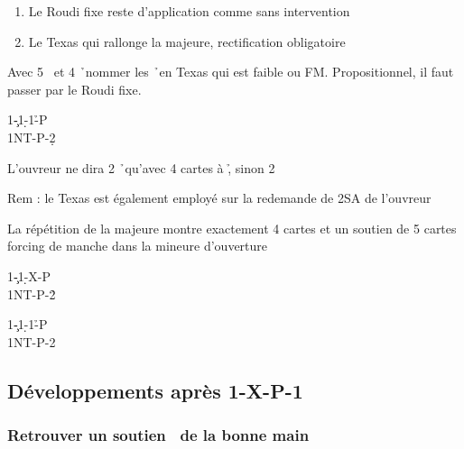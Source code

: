 \documentclass[a4paper]{article}
\begin{document}
\begin{enumerate}
\item Le Roudi fixe reste d’application comme sans intervention

\item Le Texas qui rallonge la majeure, rectification obligatoire

\end{enumerate}

Avec 5 \s\ et 4 \h\ nommer les \h\ en Texas qui est faible ou FM. 
Propositionnel, il faut passer par le Roudi fixe.

\begin{bidtable}
1\c-1\d-1\h-P\\
1NT-P-2\d
\end{bidtable}

L’ouvreur ne dira 2 \h\ qu’avec 4 cartes à \h , sinon 2 \s 

Rem : le Texas est également employé sur la redemande de 2SA de l’ouvreur

La répétition de la majeure montre exactement 4 cartes et un soutien 
de 5 cartes forcing de manche dans la mineure d’ouverture

\begin{bidtable}
1\c-1\d-X-P\\
1NT-P-2\h
\end{bidtable}

\begin{bidtable}
1\c-1\d-1\h-P\\
1NT-P-2\s
\end{bidtable}

\subsection{Développements après 1\pdfd-X-P-1\pdfh}

\subsubsection{Retrouver un soutien \pdfs\ de la bonne main}
\end{document}
